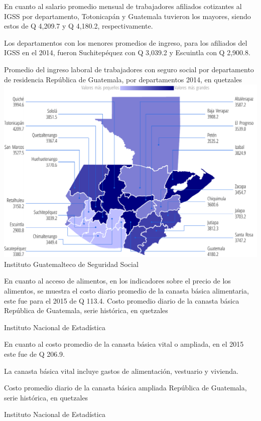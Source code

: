   {%
  En cuanto al salario promedio mensual de trabajadores afiliados cotizantes al IGSS por departamento, Totonicapán y Guatemala tuvieron los mayores, siendo estos de Q 4,209.7 y Q 4,180.2, respectivamente.
  
  Los departamentos con los menores promedios de ingreso, para los afiliados del IGSS en el 2014, fueron Suchitepéquez con Q 3,039.2 y Escuintla con Q 2,900.8.}%
  {%
  	Promedio del ingreso laboral de trabajadores con seguro social por departamento de residencia
  } %
  {%
  	República de Guatemala, por departamentos 2014, en quetzales} %
  {%
  	\includegraphics[width=52\cuadri]{graficas/3_06.pdf}}%
  {%
  	Instituto Guatemalteco de Seguridad Social} %


%
{%
En cuanto al acceso de alimentos, en los indicadores sobre el precio de los alimentos, se muestra el costo diario promedio de la canasta básica alimentaria, este fue para el 2015 de Q 113.4.}%
{%
Costo promedio diario de la canasta básica } %
{%
	República de Guatemala, serie histórica, en quetzales } %
{%
	\begin{tikzpicture}[x=1pt,y=1pt]    \end{tikzpicture}}%
{%
	Instituto Nacional de Estadística} %


%
{%
En cuanto al costo promedio de la canasta básica vital o ampliada, en el 2015 este fue de Q 206.9.

La canasta básica vital incluye gastos de alimentación, vestuario y vivienda.}%
{%
	Costo promedio diario de la canasta básica ampliada } %
{%
	República de Guatemala, serie histórica, en quetzales } %
{%
	\begin{tikzpicture}[x=1pt,y=1pt]    \end{tikzpicture}}%
{%
	Instituto Nacional de Estadística} %
